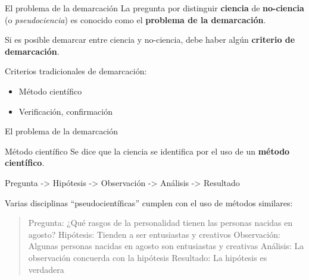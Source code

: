 \documentclass[
  ignorenonframetext,
]{beamer}
\providecommand{\tightlist}{%
  \setlength{\itemsep}{0pt}\setlength{\parskip}{0pt}}
\begin{document}
\begin{frame}{El problema de la demarcación}
\protect\hypertarget{el-problema-de-la-demarcaciuxf3n}{}
La pregunta por distinguir \textbf{ciencia} de \textbf{no-ciencia} (o
\emph{pseudociencia}) es conocido como el \textbf{problema de la
demarcación}.

Si es posible demarcar entre ciencia y no-ciencia, debe haber algún
\textbf{criterio de demarcación}.

Criterios tradicionales de demarcación:

\begin{itemize}
\tightlist
\item
  Método científico
\item
  Verificación, confirmación
\end{itemize}
\end{frame}

\begin{frame}{El problema de la demarcación}
\protect\hypertarget{el-problema-de-la-demarcaciuxf3n-1}{}
\begin{block}{Método científico}
\protect\hypertarget{muxe9todo-cientuxedfico}{}
Se dice que la ciencia se identifica por el uso de un \textbf{método
científico}.

Pregunta -\textgreater{} Hipótesis -\textgreater{} Observación
-\textgreater{} Análisis -\textgreater{} Resultado

Varias disciplinas ``pseudocientíficas'' cumplen con el uso de métodos
similares:

\begin{quote}
Pregunta: ¿Qué rasgos de la personalidad tienen las personas nacidas en
agosto? Hipótesis: Tienden a ser entusiastas y creativos Observación:
Algunas personas nacidas en agosto son entusiastas y creativas Análisis:
La observación concuerda con la hipótesis Resultado: La hipótesis es
verdadera
\end{quote}
\end{block}
\end{frame}
\end{document}
